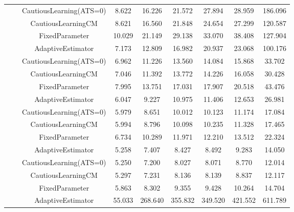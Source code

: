 \begin{table}[!h]
\begin{tabular}[t]{ccccccccc}
 &  & CautiousLearning(ATS=0) & 8.622 & 16.226 & 21.572 & 27.894 & 28.959 & 186.096\\

 &  & CautiousLearningCM & 8.621 & 16.560 & 21.848 & 24.654 & 27.299 & 120.587\\

 & \multirow[t]{-4}{*}{\centering\arraybackslash 0.75} & FixedParameter & 10.029 & 21.149 & 29.138 & 33.070 & 38.408 & 127.904\\
\cmidrule{2-9}
 &  & AdaptiveEstimator & 7.173 & 12.809 & 16.982 & 20.937 & 23.068 & 100.176\\

 &  & CautiousLearning(ATS=0) & 6.962 & 11.226 & 13.560 & 14.084 & 15.868 & 33.702\\

 &  & CautiousLearningCM & 7.046 & 11.392 & 13.772 & 14.226 & 16.058 & 30.428\\

 & \multirow[t]{-4}{*}{\centering\arraybackslash 1.00} & FixedParameter & 7.995 & 13.751 & 17.031 & 17.907 & 20.518 & 43.476\\
\cmidrule{2-9}
 &  & AdaptiveEstimator & 6.047 & 9.227 & 10.975 & 11.406 & 12.653 & 26.981\\

 &  & CautiousLearning(ATS=0) & 5.979 & 8.651 & 10.012 & 10.123 & 11.174 & 17.084\\

 &  & CautiousLearningCM & 5.994 & 8.796 & 10.098 & 10.235 & 11.328 & 17.465\\

 & \multirow[t]{-4}{*}{\centering\arraybackslash 1.25} & FixedParameter & 6.734 & 10.289 & 11.971 & 12.210 & 13.512 & 22.324\\
\cmidrule{2-9}
 &  & AdaptiveEstimator & 5.258 & 7.407 & 8.427 & 8.492 & 9.283 & 14.050\\

 &  & CautiousLearning(ATS=0) & 5.250 & 7.200 & 8.027 & 8.071 & 8.770 & 12.014\\

 &  & CautiousLearningCM & 5.297 & 7.231 & 8.136 & 8.139 & 8.837 & 12.117\\

\multirow[t]{-28}{*}{\centering\arraybackslash 1} & \multirow[t]{-4}{*}{\centering\arraybackslash 1.50} & FixedParameter & 5.863 & 8.302 & 9.355 & 9.428 & 10.264 & 14.704\\
\cmidrule{1-9}
 &  & AdaptiveEstimator & 55.033 & 268.640 & 355.832 & 349.520 & 421.552 & 611.789\\


\end{tabular}
\end{table}
